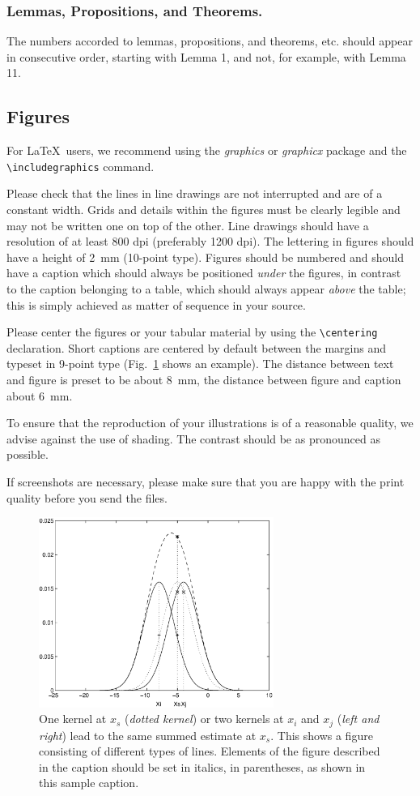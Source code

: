 \documentclass[runningheads,a4paper]{llncs}
\begin{document}
\subsubsection{Lemmas, Propositions, and Theorems.}

The numbers accorded to lemmas, propositions, and theorems, etc. should
appear in consecutive order, starting with Lemma 1, and not, for
example, with Lemma 11.

\subsection{Figures}

For \LaTeX\ users, we recommend using the \emph{graphics} or \emph{graphicx}
package and the \verb+\includegraphics+ command.

Please check that the lines in line drawings are not
interrupted and are of a constant width. Grids and details within the
figures must be clearly legible and may not be written one on top of
the other. Line drawings should have a resolution of at least 800 dpi
(preferably 1200 dpi). The lettering in figures should have a height of
2~mm (10-point type). Figures should be numbered and should have a
caption which should always be positioned \emph{under} the figures, in
contrast to the caption belonging to a table, which should always appear
\emph{above} the table; this is simply achieved as matter of sequence in
your source.

Please center the figures or your tabular material by using the \verb+\centering+
declaration. Short captions are centered by default between the margins
and typeset in 9-point type (Fig.~\ref{fig:example} shows an example).
The distance between text and figure is preset to be about 8~mm, the
distance between figure and caption about 6~mm.

To ensure that the reproduction of your illustrations is of a reasonable
quality, we advise against the use of shading. The contrast should be as
pronounced as possible.

If screenshots are necessary, please make sure that you are happy with
the print quality before you send the files.
\begin{figure}
\centering
\includegraphics[height=6.2cm]{eijkel2}
\caption{One kernel at $x_s$ (\emph{dotted kernel}) or two kernels at
$x_i$ and $x_j$ (\textit{left and right}) lead to the same summed estimate
at $x_s$. This shows a figure consisting of different types of
lines. Elements of the figure described in the caption should be set in
italics, in parentheses, as shown in this sample caption.}
\label{fig:example}
\end{figure}
\end{document}
